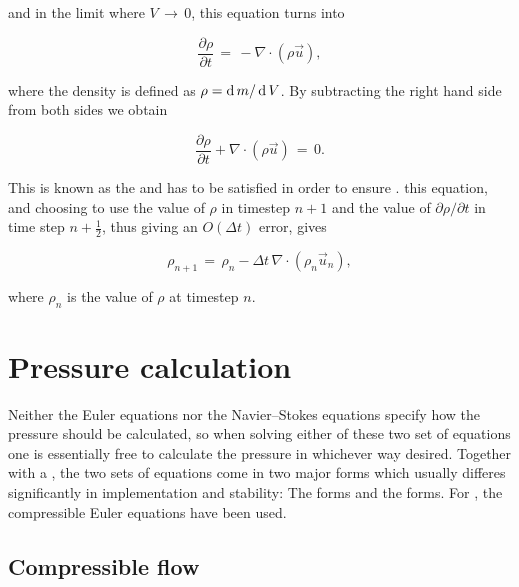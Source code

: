 and in the limit where $V \,\rightarrow\, 0$, this equation turns into

\begin{equation} \label{eq:density_partial_time_derivative}
\frac{\partial \rho}{\partial t} \,=\, -\nabla\cdot(\rho\vec{u}),
\end{equation}

where the density is defined as $\rho = \operatorname{d} m/\operatorname{d} V$. By subtracting the right hand side from both sides we obtain

\begin{equation} \label{eq:continuity_equation}
\frac{\partial \rho}{\partial t} + \nabla\cdot(\rho\vec{u}) \,=\, 0.
\end{equation}

This is known as the  and has to be satisfied in order to ensure .  this equation, and choosing to use the value of $\rho$ in timestep $n+1$ and the value of $\partial \rho/\partial t$ in time step $n+\frac{1}{2}$, thus giving an $O(\Delta t)$ error, gives

\begin{equation} \label{eq:continuity_equation_time_discretized}
\rho_{n+1} \,=\, \rho_{n} - \Delta t\,\nabla\cdot(\rho_{n}\vec{u}_{n}),
\end{equation}

where $\rho_{n}$ is the value of $\rho$ at timestep $n$.

\section{Pressure calculation}

Neither the Euler equations nor the Navier--Stokes equations specify how the pressure should be calculated, so when solving either of these two set of equations one is essentially free to calculate the pressure in whichever way desired. Together with a , the two sets of equations come in two major forms which usually differes significantly in implementation and stability: The \compressible forms and the \incompressible forms. For \thiswork, the compressible Euler equations have been used. %

\subsection{Compressible flow}

